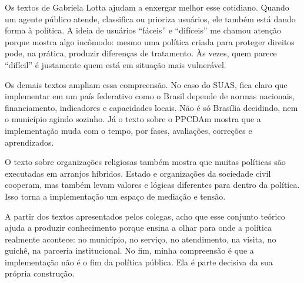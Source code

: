 \documentclass[12pt,a4paper]{article}
\begin{document}
Os textos de Gabriela Lotta ajudam a enxergar melhor esse cotidiano. Quando um agente público atende, classifica ou prioriza usuários, ele também está dando forma à política. A ideia de usuários “fáceis” e “difíceis” me chamou atenção porque mostra algo incômodo: mesmo uma política criada para proteger direitos pode, na prática, produzir diferenças de tratamento. Às vezes, quem parece “difícil” é justamente quem está em situação mais vulnerável.

Os demais textos ampliam essa compreensão. No caso do SUAS, fica claro que implementar em um país federativo como o Brasil depende de normas nacionais, financiamento, indicadores e capacidades locais. Não é só Brasília decidindo, nem o município agindo sozinho. Já o texto sobre o PPCDAm mostra que a implementação muda com o tempo, por fases, avaliações, correções e aprendizados.

O texto sobre organizações religiosas também mostra que muitas políticas são executadas em arranjos híbridos. Estado e organizações da sociedade civil cooperam, mas também levam valores e lógicas diferentes para dentro da política. Isso torna a implementação um espaço de mediação e tensão.

A partir dos textos apresentados pelos colegas, acho que esse conjunto teórico ajuda a produzir conhecimento porque ensina a olhar para onde a política realmente acontece: no município, no serviço, no atendimento, na visita, no guichê, na parceria institucional. No fim, minha compreensão é que a implementação não é o fim da política pública. Ela é parte decisiva da sua própria construção.
\end{document}
